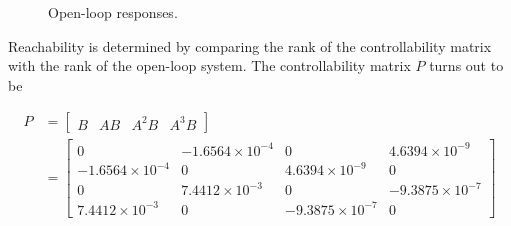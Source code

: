 \documentclass[]{aiaa-tc}%
\begin{document}
	\begin{figure}[H]
		\centering
		\caption{Open-loop responses. }
		\label{fig:StepResp}
	\end{figure}	

	Reachability is determined by comparing the rank of the controllability matrix with the rank of the open-loop system. The controllability matrix $P$ turns out to be 

	\begin{equation}
\begin{aligned}
P&=\begin{bmatrix}
B & AB & A^2B &A^3B 
\end{bmatrix}\\
&=\begin{bmatrix}
            0 &     -1.6564\times10^{-4} &             0 &    4.6394\times10^{-9}\\ 
  -1.6564\times10^{-4} &               0 &    4.6394\times10^{-9} &             0\\ 
            0 &      7.4412\times10^{-3} &             0 &   -9.3875\times10^{-7}\\ 
   7.4412\times10^{-3} &               0 &   -9.3875\times10^{-7} &             0
\end{bmatrix}
\end{aligned}
	\end{equation}
\end{document}
